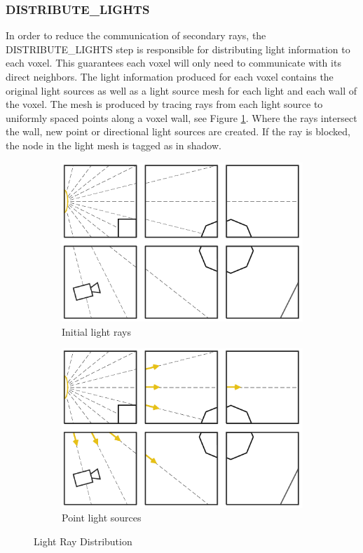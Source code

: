 \subsubsection{DISTRIBUTE\_LIGHTS}

In order to reduce the communication of secondary rays,
the DISTRIBUTE\_LIGHTS step is responsible for distributing light
information to each voxel. This guarantees each voxel will only need
to communicate with its direct neighbors. The light information
produced for each voxel contains the original light sources as well as
a light source mesh for each light and each wall of the voxel. The
mesh is produced by tracing rays from each light source to uniformly
spaced points along a voxel wall, see Figure \ref{fig:light}. Where
the rays intersect the wall, new point or directional light sources
are created. If the ray is blocked, the node in the light mesh is
tagged as in shadow.

\begin{figure}[!htb]
\centering
\begin{subfigure}{0.49\textwidth}
 \centering
  \includegraphics[width=.98\columnwidth]{drawings/Lights1.pdf}
  \caption{Initial light rays}
\end{subfigure}
\begin{subfigure}{0.49\textwidth}
 \centering
  \includegraphics[width=.98\columnwidth]{drawings/Lights2.pdf}
  \caption{Point light sources}
\end{subfigure}
\caption{Light Ray Distribution}
\label{fig:light}
\end{figure}

